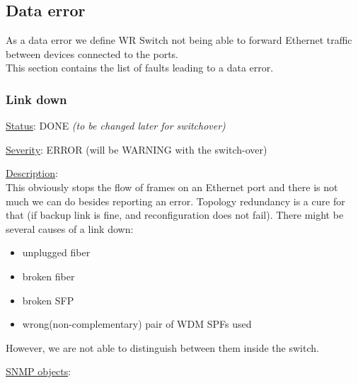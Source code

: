 \newpage
\subsection{Data error}
As a data error we define WR Switch not being able to forward Ethernet traffic
between devices connected to the ports.\\

\noindent This section contains the list of faults leading to a data error.

\subsubsection{\bf Link down}
		\label{fail:data:link_down}
		\begin{packed_enum}
			\item [] \underline{Status}: DONE  \emph{(to be changed later for switchover)}
			\item [] \underline{Severity}: ERROR (will be WARNING with the
				switch-over)
			\item [] \underline{Description}:\\
				This obviously stops the flow of frames on an Ethernet port and there is
				not much we can do besides reporting an error. Topology redundancy is a
				cure for that (if backup link is fine, and reconfiguration does not
				fail). There might be several causes of a link down:
				\begin{itemize}
					\item unplugged fiber
					\item broken fiber
					\item broken SFP
					\item wrong(non-complementary) pair of WDM SPFs used
				\end{itemize}
				However, we are not able to distinguish between them inside the switch.
			\item [] \underline{SNMP objects}:\\
				\\
		\end{packed_enum}

